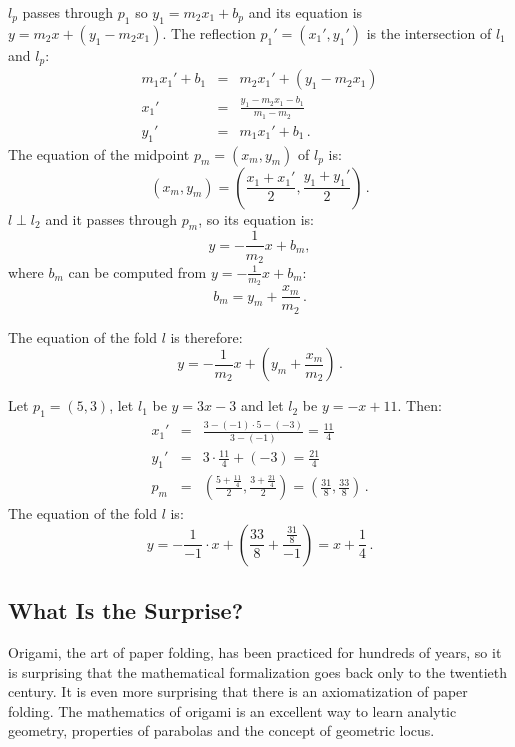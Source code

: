 $l_p$ passes through $p_1$ so $y_1=m_2x_1+b_p$ and its equation is $y=m_2x+(y_1-m_2x_1)$. The reflection $p_1'=(x_1',y_1')$ is the intersection of $l_1$ and $l_p$:
\begin{eqnarray*}
m_1x_1'+b_1&=&m_2x_1'+(y_1-m_2x_1)\\
x_1'&=&\frac{y_1-m_2x_1-b_1}{m_1-m_2}\\
y_1'&=&m_1x_1'+b_1\,.
\end{eqnarray*}
The equation of the midpoint $p_m=(x_m,y_m)$ of $l_p$ is:
\[
(x_m,y_m)=\left(\frac{x_1+x_1'}{2},\frac{y_1+y_1'}{2}\right)\,.
\]
$l\perp l_2$ and it passes through $p_m$, so its equation is:
\[
y=-\frac{1}{m_2}x+b_m,
\]
where $b_m$ can be computed from $y=-\displaystyle\frac{1}{m_2}x+b_m$:
\[b_m=y_m+\frac{x_m}{m_2}\,.\]

\newpage

The equation of the fold $l$ is therefore:
\[
y=-\frac{1}{m_2}x+\left(y_m+\displaystyle\frac{x_m}{m_2}\right)\,.
\]
\begin{example}
Let $p_1=(5,3)$, let $l_1$ be $y=3x-3$ and let $l_2$ be $y=-x+11$. Then:
\begin{eqnarray*}
x_1'&=&\frac{3-(-1)\cdot 5-(-3)}{3-(-1)}=\frac{11}{4}\\
y_1'&=&3\cdot \frac{11}{4} + (-3)=\frac{21}{4}\\
p_m&=&\left(\frac{5+\displaystyle\frac{11}{4}}{2},\frac{3+\displaystyle\frac{21}{4}}{2}\right)=\left(\frac{31}{8},\frac{33}{8}\right)\,.
\end{eqnarray*}
The equation of the fold $l$ is:
\[
y=-\frac{1}{-1}\cdot x+\left(\frac{33}{8}+\frac{\displaystyle\frac{31}{8}}{-1}\right)=x+\frac{1}{4}\,.
\]
\end{example}

\vspace{-2ex}

\subsection*{What Is the Surprise?}

Origami, the art of paper folding, has been practiced for hundreds of years, so it is surprising that the mathematical formalization goes back only to the twentieth century. It is even more surprising that there is an axiomatization of paper folding. The mathematics of origami is an excellent way to learn analytic geometry, properties of parabolas and the concept of geometric locus.

\vspace{-2ex}

